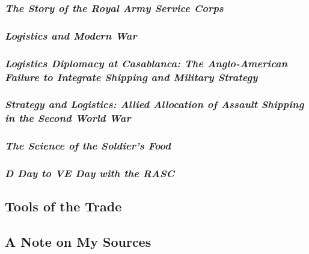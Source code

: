 \documentclass[noraggedright]{turabian-researchpaper}
\begin{document}
		\subsubsection{\textit{The Story of the Royal Army Service
			Corps}}
		\subsubsection{\textit{Logistics and Modern War}}
		\subsubsection{\textit{Logistics Diplomacy at Casablanca: 
			The Anglo-American Failure to Integrate Shipping and
			Military Strategy}}
		\subsubsection{\textit{Strategy and Logistics:  Allied
			Allocation of Assault Shipping in the Second World
			War}}
		\subsubsection{\textit{The Science of the Soldier's Food}}
		\subsubsection{\textit{D Day to VE Day with the RASC}}
	
		

		

	\subsection{Tools of the Trade} %

	
	\subsection{A Note on My Sources}
		


\end{document}
